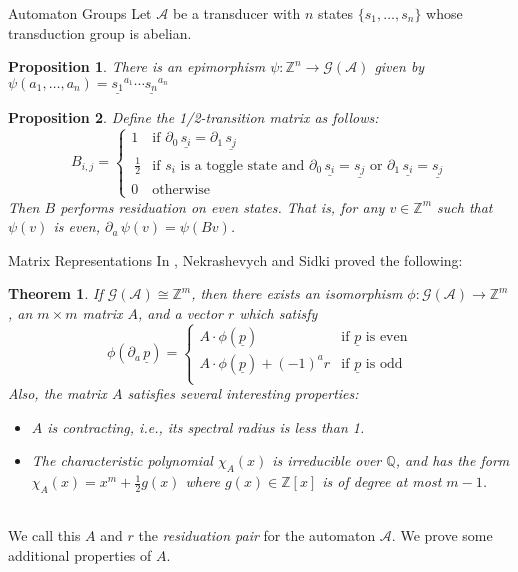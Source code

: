 \documentclass[a0]{a0poster}
\theoremstyle{pleasant}
\newtheorem{proposition}{Proposition}
\newtheorem{theorem}{Theorem}
\newcommand{\paren}[1]{\left(#1\right)}
\newcommand{\Z}{\mathbb Z}
\newcommand{\Q}{\mathbb Q}
\newcommand{\A}{\mathcal A}
\newcommand{\gp}[1]{\mathcal G\paren{#1}}
\newcommand{\aut}[1]{\underline{#1}}
\renewcommand{\d}[1]{\partial_{#1}\,}
\begin{document}
\begin{multicols}{3}
\begin{poster-section}{Automaton Groups}
Let $\A$ be a transducer with $n$ states $\{s_1,\ldots,s_n\}$ whose
transduction group is abelian.

\begin{proposition}
    There is an epimorphism $\psi : \Z^n \rightarrow \gp{\A}$ given by
    $\psi\paren{a_1,\ldots,a_n} = \aut{s_1}^{a_1} \cdots \aut{s_n}^{a_n}$
\end{proposition}

\begin{proposition}
    Define the \emph{1/2-transition matrix} as follows:
    \large
    \[
        B_{i,j} = \begin{cases}
            1 & \text{if $\d{0} \aut{s_i} = \d{1} \aut{s_j}$}\\\
            \frac{1}{2} & \text{if $s_i$ is a toggle state and
                $\d{0} \aut{s_i} = \aut{s_j}$ or
                $\d{1} \aut{s_i} = \aut{s_j}$}\\
            0 & \text{otherwise}
        \end{cases}
    \]
    \Large
    Then $B$ performs residuation on even states. That is, for any
    $v \in \Z^m$ such that $\psi(v)$ is even, $\d{a} \psi(v) = \psi (Bv)$.
    \\
\end{proposition}
\end{poster-section}

\begin{poster-section}{Matrix Representations}
\Large
In \cite{nekrashevych2004automorphisms}, Nekrashevych and Sidki proved the
following:
\begin{theorem}
    If $\gp{\A} \cong \Z^m$, then there exists an isomorphism
    $\phi : \gp{\A} \rightarrow \Z^m$, an $m \times m$ matrix $A$, and a
    vector $r$ which satisfy
    \large
    \[
        \phi (\d{a} \aut{p}) = \begin{cases}
            A \cdot \phi(\aut{p}) & \text{if $\aut{p}$ is even}\\
            A \cdot \phi(\aut{p}) + (-1)^a r &
            \text{if $\aut{p}$ is odd}\\
        \end{cases}
    \]
    \Large
    Also, the matrix $A$ satisfies several interesting properties:
    \begin{itemize}
        \item $A$ is contracting, i.e., its spectral radius is less than 1.
        \item The characteristic polynomial $\chi_A(x)$ is irreducible over
            $\Q$, and has the form $\chi_A(x) = x^m + \frac{1}{2}g(x)$ where
            $g(x) \in \Z[x]$ is of degree at most $m-1$.
    \end{itemize}
\end{theorem}
\hfill\\
We call this $A$ and $r$ the \emph{residuation pair} for the automaton
$\A$. We prove some additional properties of $A$.


\end{poster-section}
\end{multicols}
\end{document}
